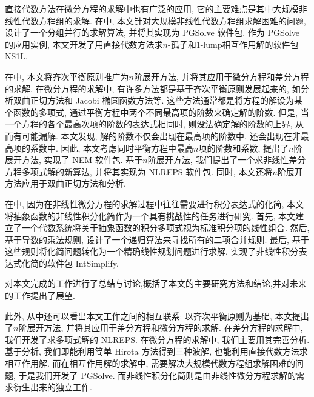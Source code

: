 直接代数方法在微分方程的求解中也有广泛的应用, 它的主要难点是其中大规模非线性代数方程组的求解. 在中, 本文针对大规模非线性代数方程组求解困难的问题, 设计了一个分组并行的求解算法, 并将其实现为 PGSolve 软件包. 作为 PGSolve 的应用实例, 本文开发了用直接代数方法求$n$-孤子和1-lump相互作用解的软件包 NS1L. 

在中, 本文将齐次平衡原则推广为$n$阶展开方法, 并将其应用于微分方程和差分方程的求解. 在微分方程的求解中, 有许多方法都是基于齐次平衡原则发展起来的, 如\Painleve{}分析\D 双曲正切方法和 Jacobi 椭圆函数方法等. 这些方法通常都是将方程的解设为某个函数的多项式, 通过平衡方程中两个不同最高项的阶数来确定解的阶数. 但是, 当一个方程的各个最高次项的阶数的表达式相同时, 则没法确定解的阶数的上界, 从而有可能漏解. 本文发现, 解的阶数不仅会出现在最高项的阶数中, 还会出现在非最高项的系数中. 因此, 本文考虑同时平衡方程中最高$n$项的阶数和系数, 提出了$n$阶展开方法, 实现了 NEM 软件包. 基于$n$阶展开方法, 我们提出了一个求非线性差分方程多项式解的新算法, 并将其实现为 NLREPS 软件包. 同时, 本文还将$n$阶展开方法应用于双曲正切方法和\Painleve{}分析. 

在中, 因为在非线性微分方程的求解过程中往往需要进行积分表达式的化简, 本文将抽象函数的非线性积分化简作为一个具有挑战性的任务进行研究. 首先, 本文建立了一个代数系统将关于抽象函数的积分多项式视为标准积分项的线性组合. 然后, 基于导数的乘法规则, 设计了一个递归算法来寻找所有的二项合并规则. 最后, 基于这些规则将化简问题转化为一个精确线性规划问题进行求解, 实现了非线性积分表达式化简的软件包 IntSimplify.  

对本文完成的工作进行了总结与讨论,概括了本文的主要研究方法和结论,并对未来的工作提出了展望.

此外, 从中还可以看出本文工作之间的相互联系: 以齐次平衡原则为基础, 本文提出了$n$阶展开方法, 并将其应用于差分方程和微分方程的求解. 在差分方程的求解中, 我们开发了求多项式解的 NLREPS. 在微分方程的求解中, 我们主要用其完善\Painleve{}分析. 基于\Painleve{}分析, 我们即能利用简单 Hirota 方法得到三种波解, 也能利用直接代数方法求相互作用解. 而在相互作用解的求解中, 需要解决大规模代数方程组求解困难的问题, 于是我们开发了 PGSolve. 而非线性积分化简则是由非线性微分方程求解的需求衍生出来的独立工作. 
